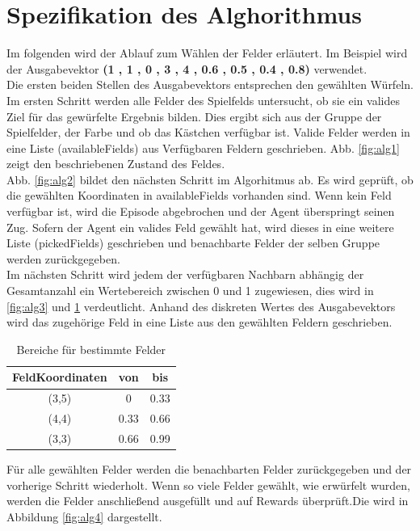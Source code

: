 \newpage
\section{Spezifikation des Alghorithmus}
Im folgenden wird der Ablauf zum Wählen der Felder erläutert. Im Beispiel wird der Ausgabevektor \textbf{(1 , 1 , 0 , 3 , 4 , 0.6 , 0.5 , 0.4 , 0.8)} verwendet. \\
Die ersten beiden Stellen des Ausgabevektors entsprechen den gewählten Würfeln.
Im ersten Schritt werden alle Felder des Spielfelds untersucht, ob sie ein valides Ziel für das gewürfelte Ergebnis bilden. Dies ergibt sich aus der Gruppe der Spielfelder, der Farbe und ob das Kästchen verfügbar ist.
Valide Felder werden in eine Liste (availableFields) aus Verfügbaren Feldern geschrieben. Abb. \ref{fig:alg1} zeigt den beschriebenen Zustand des Feldes.\\
Abb. \ref{fig:alg2} bildet den nächsten Schritt im Algorhitmus ab.
Es wird geprüft, ob die gewählten Koordinaten in availableFields vorhanden sind.
Wenn kein Feld verfügbar ist, wird die Episode abgebrochen und der Agent überspringt seinen Zug.
Sofern der Agent ein valides Feld gewählt hat, wird dieses in eine weitere Liste (pickedFields) geschrieben und benachbarte Felder der selben Gruppe werden zurückgegeben. \\
Im nächsten Schritt wird jedem der verfügbaren Nachbarn abhängig der Gesamtanzahl ein Wertebereich zwischen 0 und 1 zugewiesen, dies wird in \ref{fig:alg3} und \ref{tab:field_ranges} verdeutlicht. Anhand des diskreten Wertes des Ausgabevektors wird das zugehörige Feld in eine Liste aus den gewählten Feldern geschrieben.
\begin{table}[!h]
    \centering
    \begin{tabular}{|c|c|c|}
    \hline
    \textbf{FeldKoordinaten} & \textbf{von} & \textbf{bis} \\
    \hline
    (3,5) & 0 & 0.33 \\
    \hline
    (4,4) & 0.33 & 0.66 \\
    \hline
    (3,3) & 0.66 & 0.99 \\
    \hline
    \end{tabular}
    \caption{Bereiche für bestimmte Felder}
    \label{tab:field_ranges}
\end{table}

Für alle gewählten Felder werden die benachbarten Felder zurückgegeben und der vorherige Schritt wiederholt.
Wenn so viele Felder gewählt, wie erwürfelt wurden, werden die Felder anschließend ausgefüllt und auf Rewards überprüft.Die wird in Abbildung \ref{fig:alg4} dargestellt.


